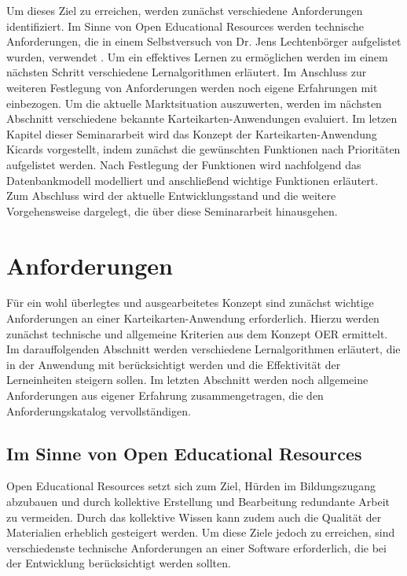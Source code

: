 Um dieses Ziel zu erreichen, werden zunächst verschiedene Anforderungen identifiziert. Im Sinne von Open Educational Resources werden technische Anforderungen, die in einem Selbstversuch von Dr. Jens Lechtenbörger aufgelistet wurden, verwendet \cite{Lechtenborger.2019}. Um ein effektives Lernen zu ermöglichen werden im einem nächsten Schritt verschiedene Lernalgorithmen erläutert. Im Anschluss zur weiteren Festlegung von Anforderungen werden noch eigene Erfahrungen mit einbezogen. Um die aktuelle Marktsituation auszuwerten, werden im nächsten Abschnitt verschiedene bekannte Karteikarten-Anwendungen evaluiert. Im letzen Kapitel dieser Seminararbeit wird das Konzept der Karteikarten-Anwendung Kicards vorgestellt, indem zunächst die gewünschten Funktionen nach Prioritäten aufgelistet werden. Nach Festlegung der Funktionen wird nachfolgend das Datenbankmodell modelliert und anschließend wichtige Funktionen erläutert. Zum Abschluss wird der aktuelle Entwicklungsstand und die weitere Vorgehensweise dargelegt, die über diese Seminararbeit hinausgehen.

\section{Anforderungen}
Für ein wohl überlegtes und ausgearbeitetes Konzept sind zunächst wichtige Anforderungen an einer Karteikarten-Anwendung erforderlich. Hierzu werden zunächst technische und allgemeine Kriterien aus dem Konzept OER ermittelt. Im darauffolgenden Abschnitt werden verschiedene Lernalgorithmen erläutert, die in der Anwendung mit berücksichtigt werden und die Effektivität der Lerneinheiten steigern sollen. Im letzten Abschnitt werden noch allgemeine Anforderungen aus eigener Erfahrung zusammengetragen, die den Anforderungskatalog vervollständigen.

\subsection{Im Sinne von Open Educational Resources}
Open Educational Resources setzt sich zum Ziel, Hürden im Bildungszugang abzubauen und durch kollektive Erstellung und Bearbeitung redundante Arbeit zu vermeiden. Durch das kollektive Wissen kann zudem auch die Qualität der Materialien erheblich gesteigert werden. Um diese Ziele jedoch zu erreichen, sind verschiedenste technische Anforderungen an einer Software erforderlich, die bei der Entwicklung berücksichtigt werden sollten. \\


